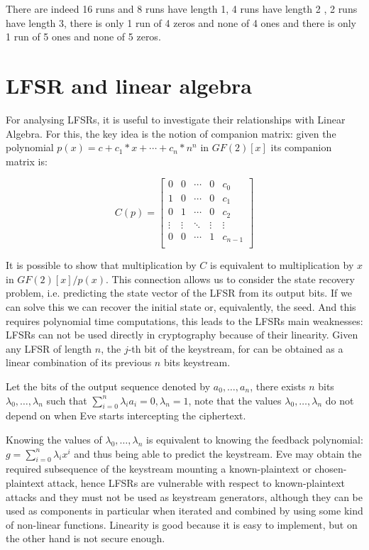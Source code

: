 There are indeed 16 runs and 8 runs have length 1, 4 runs have length 2 , 2 runs have length 3, there is only 1 run of 4 zeros and none of 4 ones and there is only 1 run of 5 ones and none of 5 zeros.

\section{LFSR and linear algebra}

For analysing LFSRs, it is useful to investigate their relationships with Linear Algebra. For this, the key idea is the notion of companion matrix: given the polynomial $p(x) = c + c_1 * x + \cdots + c_n * n^n$ in $GF(2)[x]$ its companion matrix is:

\[
C(p) =
\left[ {\begin{array}{ccccc}
		0 & 0 & \cdots & 0 & c_{0}\\
		1 & 0 & \cdots & 0 & c_{1}\\
		0 & 1 & \cdots & 0 & c_{2}\\
		\vdots & \vdots & \ddots & \vdots & \vdots\\
		0 & 0 &\cdots & 1 & c_{n-1}\\
\end{array} } \right]
\]

It is possible to show that multiplication by $C$ is equivalent to multiplication by $x$ in $GF(2)[x]/p(x)$.
This connection allows us to consider the state recovery problem, i.e. predicting the state vector of the LFSR from its output bits. If we can solve this we can recover the initial state or, equivalently, the seed. And this requires polynomial time computations, this leads to the LFSRs main weaknesses: LFSRs can not be used directly in cryptography because of their linearity. Given any LFSR of length $n$, the $j$-th bit of the keystream, for can be obtained as a linear combination of its previous $n$ bits keystream.

Let the bits of the output sequence denoted by $a_0,\ldots,a_n$, there exists $n$ bits $\lambda_0,\ldots,\lambda_n$ such that $\sum_{i=0}^{n} \lambda_i a_i = 0, \lambda_n = 1$, note that the values $\lambda_0,\ldots,\lambda_n$ do not depend on when Eve starts intercepting the ciphertext.

Knowing the values of $\lambda_0,\ldots,\lambda_n$ is equivalent to knowing the feedback polynomial: $g=\sum_{i=0}^{n} \lambda_i x^i$ and thus being able to predict the keystream. Eve may obtain the required subsequence of the keystream mounting a known-plaintext or chosen-plaintext attack, hence LFSRs are vulnerable with respect to known-plaintext attacks and they must not be used as keystream generators, although they can be used as components in particular when iterated and combined by using some kind of non-linear functions. Linearity is good because it is easy to implement, but on the other hand is not secure enough.

